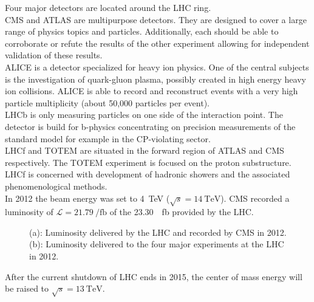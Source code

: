 Four major detectors are located around the LHC ring. \\
CMS \cite{cmsTDR1} and ATLAS \cite{AtlasTDR} are multipurpose detectors. They are designed to cover a large range of physics topics and particles. Additionally, each should be able to corroborate or refute the results of the other experiment allowing for independent validation of these results.\\
ALICE \cite{AliceTDR} is a detector specialized for heavy ion physics. One of the central subjects is the investigation of quark-gluon plasma, possibly created in high energy heavy ion collisions. ALICE is able to record and reconstruct events with a very high particle multiplicity (about 50,000 particles per event). \\
LHCb \cite{LHCbTDR} is only measuring particles on one side of the interaction point. The detector is build for b-physics concentrating on precision measurements of the standard model for example in the CP-violating sector.\\
LHCf \cite{LHCfTDR} and TOTEM \cite{TOTEMTDR} are situated in the forward region of ATLAS and CMS respectively. The TOTEM experiment is focused on the proton substructure. LHCf is concerned with development of hadronic showers and the associated phenomenological methods. \\
In 2012 the beam energy was set to \SI{4}{\tera \electronvolt} ($\sqrt{s} = \SI{14}{\tera \electronvolt}$). CMS recorded a luminosity of $\mathcal{L} = \SI{21.79}{\per \femto \barn}$ of the \SI{23.30}{\per \femto \barn} provided by the LHC. \\

\begin{figure}[ht]
  \caption{(a): Luminosity delivered by the LHC and recorded by CMS in 2012.\cite{lumi_cms} (b): Luminosity delivered to the four major experiments at the LHC in 2012.\cite{lumi_lhc}}
  \label{fig_det_lumi}
\end{figure}

After the current shutdown of LHC ends in 2015, the center of mass energy will be raised to $\sqrt{s} = \SI{13}{\tera \electronvolt}$.


